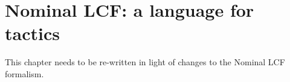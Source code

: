 \chapter{Nominal LCF: a language for tactics}

This chapter needs to be re-written in light of changes to the Nominal LCF formalism.

